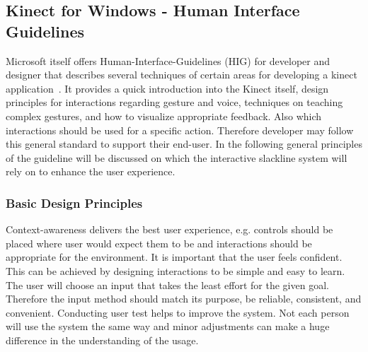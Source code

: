 \subsection{Kinect for Windows - Human Interface Guidelines}\label{2_5_2_kinectHIG}
Microsoft itself offers Human-Interface-Guidelines (HIG) for developer and designer that describes several techniques of certain areas for developing a kinect application~\cite{MicrosoftHIG2014-mh}. It provides a quick introduction into the Kinect itself, design principles for interactions regarding gesture and voice, techniques on teaching complex gestures, and how to visualize appropriate feedback. Also which interactions should be used for a specific action. Therefore developer may follow this general standard to support their end-user. In the following general principles of the guideline will be discussed on which the interactive slackline system will rely on to enhance the user experience. 

\subsubsection{Basic Design Principles}
Context-awareness delivers the best user experience, e.g. controls should be placed where user would expect them to be and interactions should be appropriate for the environment. It is important that the user feels confident. This can be achieved by designing interactions to be simple and easy to learn. The user will choose an input that takes the least effort for the given goal. Therefore the input method should match its purpose, be reliable, consistent, and convenient. Conducting user test helps to improve the system. Not each person will use the system the same way and minor adjustments can make a huge difference in the understanding of the usage.

